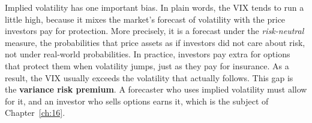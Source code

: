 Implied volatility has one important bias. In plain words, the VIX tends to run a little high, because it mixes the market's forecast of volatility with the price investors pay for protection. More precisely, it is a forecast under the \emph{risk-neutral} measure, the probabilities that price assets as if investors did not care about risk, not under real-world probabilities. In practice, investors pay extra for options that protect them when volatility jumps, just as they pay for insurance. As a result, the VIX usually exceeds the volatility that actually follows. This gap is the \textbf{variance risk premium}. A forecaster who uses implied volatility must allow for it, and an investor who sells options earns it, which is the subject of Chapter~\ref{ch:16}.

